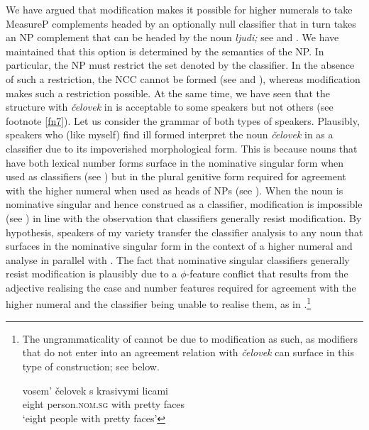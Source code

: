 \documentclass[output=paper,
modfonts,
newtxmath,
hidelinks
]{langscibook}
\begin{document}
We have argued that modification makes it possible for higher numerals to take MeasureP complements headed by an optionally null classifier that in turn takes an NP complement that can be headed by the noun \textit{ljudi;} see  and . We have maintained that this option is determined by the semantics of the NP. In particular, the NP must restrict the set denoted by the classifier. In the absence of such a restriction, the NCC cannot be formed (see  and ), whereas modification makes such a restriction possible. At the same time, we have seen that the structure with \textit{čelovek} in  is acceptable to some speakers but not others (see footnote \ref{fn7}). Let us consider the grammar of both types of speakers. Plausibly, speakers who (like myself) find  ill formed interpret the noun \textit{čelovek} in  as a classifier due to its impoverished morphological form. This is because nouns that have both lexical number forms surface in the nominative singular form when used as classifiers (see ) but in the plural genitive form required for agreement with the higher numeral when used as heads of NPs (see ). When the noun is nominative singular and hence construed as a classifier, modification is impossible (see ) in line with the observation that classifiers generally resist modification. By hypothesis, speakers of my variety transfer the classifier analysis to any noun that surfaces in the nominative singular form in the context of a higher numeral and analyse  in parallel with .
\ea \label{ex18}
	\z
\z
\largerpage[-2]
\noindent The fact that nominative singular classifiers generally resist modification is plausibly due to a ${\phi}$-feature conflict that results from the adjective realising the case and number features required for agreement with the higher numeral and the classifier being unable to realise them, as in .\footnote{\label{fn14}The ungrammaticality of  cannot be due to modification as such, as modifiers that do not enter into an agreement relation with \textit{čelovek} can surface in this type of construction; see  below.

\ea \label{fn14i}
\gll vosem’  čelovek    s   krasivymi   licami\\
eight  person.\textsc{nom.sg}  with  pretty    faces\\
\glt `eight people with pretty faces'
\zlast 
}
\end{document}
